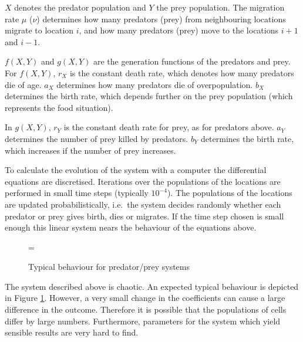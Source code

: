 $X$ denotes the predator population and $Y$ the prey population. The
migration rate $\mu$ ($\nu$) determines how many predators (prey) from
neighbouring locations migrate to location $i$, and how many predators
(prey) move to the locations $i + 1$ and $i - 1$.

$f(X, Y)$ and $g(X, Y)$ are the generation functions of the predators
and prey. For $f(X, Y)$, $r_X$ is the constant death rate, which denotes
how many predators die of age. $a_X$ determines how many predators die
of overpopulation. $b_X$ determines the birth rate, which depends further on
the prey population (which represents the food situation).

In $g(X,Y)$, $r_Y$ is the constant death rate for prey, as for
predators above. $a_Y$ determines the number of prey killed by
predators. $b_Y$ determines the birth rate, which increases if the
number of prey increases.

To calculate the evolution of the system with a computer the
differential equations are discretised. Iterations
over the populations of the locations are performed in small time
steps (typically $10^{-4}$). The populations of
the locations are updated probabilistically, i.e.\ the system decides
randomly whether each predator or prey gives birth, dies or migrates. If
the time step chosen is small enough this linear system nears the
behaviour of the equations above.

\begin{figure}
\epsfxsize=\textwidth
{}
\caption{Typical behaviour for predator/prey systems}
\label{fTypical}
\end{figure}

The system described above is chaotic. An expected typical behaviour
is depicted in Figure \ref{fTypical}. However, a very small change in the
coefficients can cause a large difference in the outcome. Therefore it is
possible that the populations of cells differ by large numbers.
Furthermore, parameters for the system which yield sensible results are
very hard to find.

